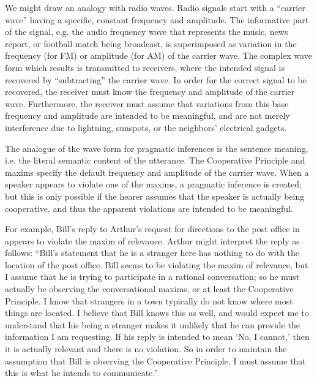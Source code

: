 We might draw an analogy with radio waves. Radio signals start with a “carrier wave” having a specific, constant frequency and amplitude. The informative part of the signal, e.g. the audio frequency wave that represents the music, news report, or football match being broadcast, is superimposed as variation in the frequency (for FM) or amplitude (for AM) of the carrier wave. The complex wave form which results is transmitted to receivers, where the intended signal is recovered by “subtracting” the carrier wave. In order for the correct signal to be recovered, the receiver must know the frequency and amplitude of the carrier wave. Furthermore, the receiver must assume that variations from this base frequency and amplitude are intended to be meaningful, and are not merely interference due to lightning, sunspots, or the neighbors’ electrical gadgets.



The analogue of the wave form for pragmatic inferences is the sentence meaning, i.e. the literal semantic content of the utterance. The Cooperative Principle and maxims specify the default frequency and amplitude of the carrier wave. When a speaker appears to violate one of the maxims, a pragmatic inference is created; but this is only possible if the hearer assumes that the speaker is actually being cooperative, and thus the apparent violations are intended to be meaningful.



For example, Bill’s reply to Arthur’s request for directions to the post office in  appears to violate the maxim of relevance. Arthur might interpret the reply as follows: “Bill’s statement that he is a stranger here has nothing to do with the location of the post office. Bill seems to be violating the maxim of relevance, but I assume that he is trying to participate in a rational conversation; so he must actually be observing the conversational maxims, or at least the Cooperative Principle. I know that strangers in a town typically do not know where most things are located. I believe that Bill knows this as well, and would expect me to understand that his being a stranger makes it unlikely that he can provide the information I am requesting. If his reply is intended to mean ‘No, I cannot,’ then it is actually relevant and there is no violation. So in order to maintain the assumption that Bill is observing the Cooperative Principle, I must assume that this is what he intends to communicate.”



